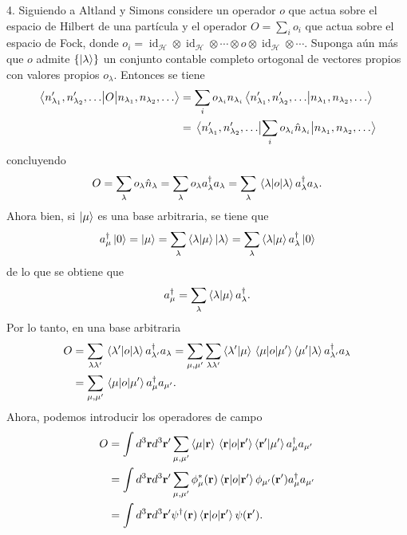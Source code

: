 \documentclass{article}
\DeclareMathOperator{\id}{id}
\begin{document}
4. Siguiendo a Altland y Simons considere un operador $o$ que actua sobre el espacio de Hilbert de una partícula y el operador $O=\sum_i o_i$ que actua sobre el espacio de Fock, donde $o_i=\id_\mathcal{H}\otimes\id_\mathcal{H}\otimes\cdots\otimes o \otimes\id_\mathcal{H}\otimes\cdots$. Suponga aún más que $o$ admite $\{\ket{\lambda}\}$ un conjunto contable completo ortogonal de vectores propios con valores propios $o_\lambda$. Entonces se tiene
\begin{align}
\begin{split}
\mel{n'_{\lambda_1},n'_{\lambda_2},\dots}{O}{n_{\lambda_1},n_{\lambda_2},\dots}&=\sum_i o_{\lambda_i}n_{\lambda_i}\ip{n'_{\lambda_1},n'_{\lambda_2},\dots}{n_{\lambda_1},n_{\lambda_2},\dots}\\
&=\mel{n'_{\lambda_1},n'_{\lambda_2},\dots}{\sum_i o_{\lambda_i}\hat{n}_{\lambda_i}}{n_{\lambda_1},n_{\lambda_2},\dots}
\end{split}
\end{align}
concluyendo
\begin{equation}
O=\sum_\lambda o_{\lambda}\hat{n}_{\lambda}=\sum_\lambda o_{\lambda}a_{\lambda}^\dagger a_\lambda =\sum_\lambda \ev{o}{\lambda}a_{\lambda}^\dagger a_{\lambda}.
\end{equation}
Ahora bien, si $\ket{\mu}$ es una base arbitraria, se tiene que 
\begin{equation}
a_\mu^\dagger\ket{0}=\ket{\mu}=\sum_\lambda \ip{\lambda}{\mu}\ket{\lambda}=\sum_\lambda\ip{\lambda}{\mu}a_\lambda^\dagger\ket{0}
\end{equation}
de lo que se obtiene que 
\begin{equation}
a_\mu^\dagger=\sum_\lambda\ip{\lambda}{\mu}a_\lambda^\dagger.
\end{equation}
Por lo tanto, en una base arbitraria
\begin{align}
\begin{split}
O&=\sum_{\lambda\lambda'} \mel{\lambda'}{o}{\lambda}a_{\lambda'}^\dagger a_{\lambda}=\sum_{\mu,\mu'}\sum_{\lambda\lambda'}\ip{\lambda'}{\mu}\mel{\mu}{o}{\mu'}\ip{\mu'}{\lambda}a_{\lambda'}^\dagger a_{\lambda}\\
&=\sum_{\mu,\mu'}\mel{\mu}{o}{\mu'}a_{\mu}^\dagger a_{\mu'}.
\end{split}
\end{align}
Ahora, podemos introducir los operadores de campo
\begin{align}
\begin{split}
O&=\int d^3\vb{r}d^3\vb{r}'\sum_{\mu,\mu'}\ip{\mu}{\vb{r}}\mel{\vb{r}}{o}{\vb{r}'}\ip{\vb{r}'}{\mu'}a_{\mu}^\dagger a_{\mu'}\\
&=\int d^3\vb{r}d^3\vb{r}'\sum_{\mu,\mu'}\phi_\mu^*(\vb{r})\mel{\vb{r}}{o}{\vb{r}'}\phi_{\mu'}(\vb{r}')a_{\mu}^\dagger a_{\mu'}\\
&=\int d^3\vb{r}d^3\vb{r}'\psi^\dagger(\vb{r})\mel{\vb{r}}{o}{\vb{r}'}\psi(\vb{r'}).\\
\end{split}
\end{align}
\end{document}
